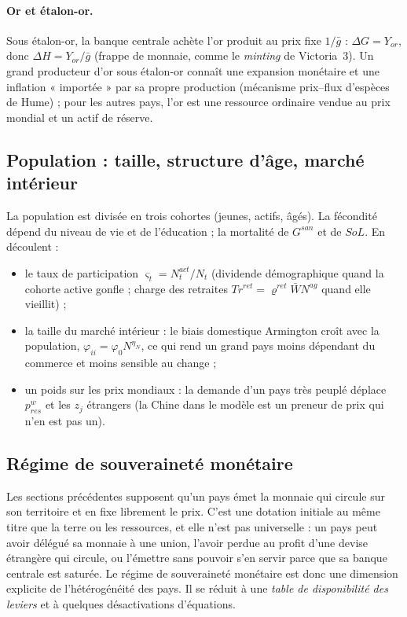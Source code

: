 \documentclass[11pt,a4paper]{article}
\newcommand{\og}{« }
\newcommand{\fg}{ »}
\begin{document}
\paragraph{Or et étalon-or.} Sous étalon-or, la banque centrale achète l'or produit au prix fixe $1/\bar g$ : $\Delta G = Y_{or}$, donc $\Delta H = Y_{or}/\bar g$ (frappe de monnaie, comme le \emph{minting} de Victoria~3). Un grand producteur d'or sous étalon-or connaît une expansion monétaire et une inflation \og importée\fg{} par sa propre production (mécanisme prix--flux d'espèces de Hume) ; pour les autres pays, l'or est une ressource ordinaire vendue au prix mondial et un actif de réserve.

\subsection{Population : taille, structure d'âge, marché intérieur}
La population est divisée en trois cohortes (jeunes, actifs, âgés). La fécondité dépend du niveau de vie et de l'éducation ; la mortalité de $G^{san}$ et de $SoL$. En découlent :
\begin{itemize}
\item le taux de participation $\varsigma_t = N^{act}_t / N_t$ (dividende démographique quand la cohorte active gonfle ; charge des retraites $Tr^{ret} = \varrho^{ret}\bar W N^{ag}$ quand elle vieillit) ;
\item la taille du marché intérieur : le biais domestique Armington croît avec la population, $\varphi_{ii} = \varphi_0 N^{\eta_N}$, ce qui rend un grand pays moins dépendant du commerce et moins sensible au change ;
\item un poids sur les prix mondiaux : la demande d'un pays très peuplé déplace $p^w_{res}$ et les $z_j$ étrangers (la Chine dans le modèle est un preneur de prix qui n'en est pas un).
\end{itemize}

\subsection{Régime de souveraineté monétaire}
\label{sec:souv}
Les sections précédentes supposent qu'un pays émet la monnaie qui circule sur son territoire et en fixe librement le prix. C'est une dotation initiale au même titre que la terre ou les ressources, et elle n'est pas universelle : un pays peut avoir délégué sa monnaie à une union, l'avoir perdue au profit d'une devise étrangère qui circule, ou l'émettre sans pouvoir s'en servir parce que sa banque centrale est saturée. Le régime de souveraineté monétaire est donc une dimension explicite de l'hétérogénéité des pays. Il se réduit à une \emph{table de disponibilité des leviers} et à quelques désactivations d'équations.
\end{document}
